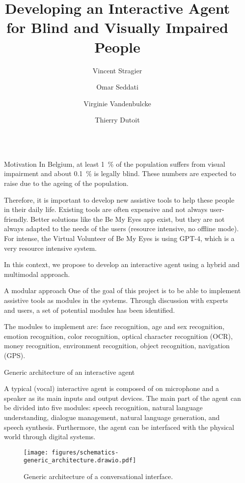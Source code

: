 \documentclass[final]{beamer}
\title{Developing an Interactive Agent for Blind and Visually Impaired People}
\author{Vincent Stragier \inst{1} \and Omar Seddati \inst{1} \and Virginie Vandenbulcke \inst{1} \and Thierry Dutoit \inst{1}}
\institute[shortinst]{\inst{1} Numediart Institute, ISIA Lab, Faculty of Engineering — University of Mons — Boulevard Dolez 31, 7000 Mons, Hainaut, Belgium}
\newlength{\sepwidth}
\newlength{\colwidth}
\newcommand{\separatorcolumn}{\begin{column}{\sepwidth}\end{column}}
\begin{document}
\begin{frame}[t]
  \begin{columns}[t]
    \separatorcolumn

    \begin{column}{\colwidth}

      \begin{block}{Motivation}
        In Belgium, at least 1~\% of the population suffers from visual impairment and about 0.1~\% is legally blind\cite{CeciteDeficienceVisuelle2023, naczykEqla2020}. These numbers are expected to raise due to the ageing of the population.

        Therefore, it is important to develop new assistive tools to help these people in their daily life. Existing tools are often expensive and not always user-friendly. Better solutions like the Be My Eyes\cite{IntroducingOurVirtual2023} app exist, but they are not always adapted to the needs of the users (resource intensive, no offline mode). For intense, the Virtual Volunteer of Be My Eyes is using GPT-4\cite{GPT42023}, which is a very resource intensive system.

        In this context, we propose to develop an interactive agent using a hybrid and multimodal approach.
      \end{block}

      \begin{block}{A modular approach}
        One of the goal of this project is to be able to implement assistive tools as modules in the systems. Through discussion with experts and users, a set of potential modules has been identified.

        The modules to implement are: face recognition, age and sex recognition, emotion recognition, color recognition, optical character recognition (OCR), money recognition, environment recognition, object recognition, navigation (GPS).
      \end{block}

      \begin{alertblock}{Generic architecture of an interactive agent}

        A typical (vocal) interactive agent is composed of on microphone and a speaker as its main inputs and output devices. The main part of the agent can be divided into five modules: speech recognition, natural language understanding, dialogue management, natural language generation, and speech synthesis. Furthermore, the agent can be interfaced with the physical world through digital systems.
        \begin{figure}[ht]
          \centering
          \texttt{[image: figures/schematics-generic\_architecture.drawio.pdf]}
          \caption{Generic architecture of a conversational interface\cite{lugrinHandbookSociallyInteractive2021}.\label{fig:architecture_conversational_interface}}
        \end{figure}


\end{alertblock}
\end{column}
\end{columns}
\end{frame}
\end{document}
